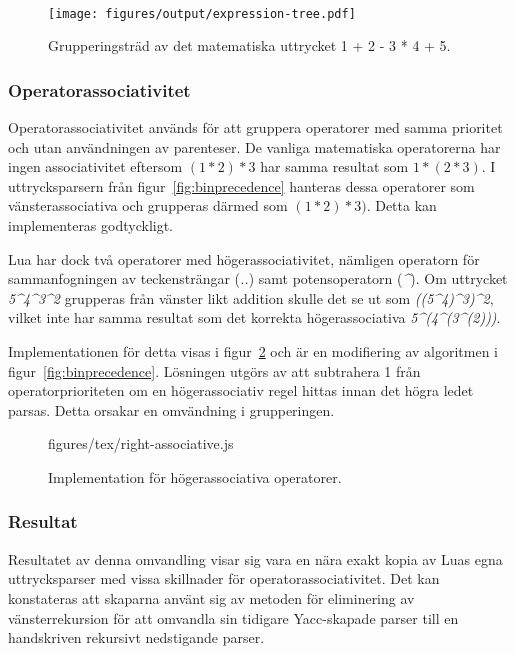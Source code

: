 \begin{figure}
  \hfill
  \hfill \\
  \texttt{[image: figures/output/expression-tree.pdf]}
  \caption{Grupperingsträd av det matematiska uttrycket 1 + 2 - 3 * 4 + 5.}
  \label{fig:expressiontree}
\end{figure}

\subsubsection{Operatorassociativitet}

Operatorassociativitet används för att gruppera operatorer med samma prioritet
och utan användningen av parenteser. De vanliga matematiska operatorerna har ingen
associativitet eftersom $(1 * 2) * 3$ har samma resultat som $1 * (2 * 3)$. I
uttrycksparsern från figur~\ref{fig:binprecedence} hanteras dessa operatorer
som vänsterassociativa och grupperas därmed som $(1 * 2) * 3)$. Detta kan
implementeras godtyckligt.

Lua har dock två operatorer med högerassociativitet, nämligen operatorn för
sammanfogningen av teckensträngar (\textit{..}) samt potensoperatorn
(\textit{\^{}}). Om uttrycket \textit{5\^{}4\^{}3\^{}2} grupperas från vänster likt
addition skulle det se ut som \textit{((5\^{}4)\^{}3)\^{}2}, vilket inte har
samma resultat som det korrekta högerassociativa \textit{5\^{}(4\^{}(3\^{}(2)))}.

Implementationen för detta visas i figur~\ref{fig:rightassociative} och är en
modifiering av algoritmen i figur~\ref{fig:binprecedence}. Lösningen utgörs av
att subtrahera 1 från operatorprioriteten om en högerassociativ regel hittas
innan det högra ledet parsas. Detta orsakar en omvändning i grupperingen.

\begin{figure}[ht]
    {figures/tex/right-associative.js}
  \caption{Implementation för högerassociativa operatorer.}
  \label{fig:rightassociative}
\end{figure}

\subsubsection{Resultat}

Resultatet av denna omvandling visar sig vara en nära exakt kopia av Luas egna
uttrycksparser med vissa skillnader för operatorassociativitet. Det kan
konstateras att skaparna använt sig av metoden för eliminering av
vänsterrekursion för att omvandla sin tidigare Yacc-skapade parser till en
handskriven rekursivt nedstigande parser.

